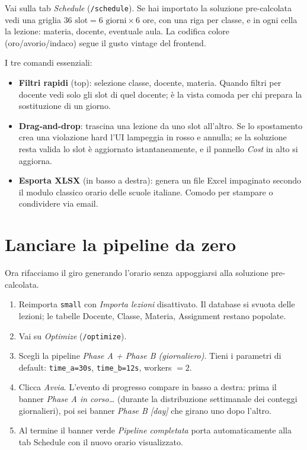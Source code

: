 
Vai sulla tab \emph{Schedule} (\texttt{/schedule}). Se hai
importato la soluzione pre-calcolata vedi una griglia
$36\text{ slot} = 6\text{ giorni} \times 6\text{ ore}$, con
una riga per classe, e in ogni cella la lezione: materia, docente,
eventuale aula. La codifica colore (oro/avorio/indaco) segue il
gusto vintage del frontend.

I tre comandi essenziali:

\begin{itemize}
\item \textbf{Filtri rapidi} (top): selezione classe, docente,
  materia. Quando filtri per docente vedi solo gli slot di quel
  docente; \`e la vista comoda per chi prepara la sostituzione di
  un giorno.
\item \textbf{Drag-and-drop}: trascina una lezione da uno slot
  all'altro. Se lo spostamento crea una violazione hard l'UI
  lampeggia in rosso e annulla; se la soluzione resta valida
  lo slot \`e aggiornato istantaneamente, e il pannello
  \emph{Cost} in alto si aggiorna.
\item \textbf{Esporta XLSX} (in basso a destra): genera un file
  Excel impaginato secondo il modulo classico orario delle scuole
  italiane. Comodo per stampare o condividere via email.
\end{itemize}

\section{Lanciare la pipeline da zero}


Ora rifacciamo il giro generando l'orario senza appoggiarsi alla
soluzione pre-calcolata.

\begin{enumerate}
\item Reimporta \texttt{small} con \emph{Importa lezioni}
  disattivato. Il database si svuota delle lezioni; le tabelle
  Docente, Classe, Materia, Assignment restano popolate.
\item Vai su \emph{Optimize} (\texttt{/optimize}).
\item Scegli la pipeline \emph{Phase A + Phase B (giornaliero)}.
  Tieni i parametri di default: \texttt{time\_a=30s},
  \texttt{time\_b=12s}, workers $= 2$.
\item Clicca \emph{Avvia}. L'evento di progresso compare in basso
  a destra: prima il banner \emph{Phase A in corso\ldots}
  (durante la distribuzione settimanale dei conteggi giornalieri),
  poi sei banner \emph{Phase B [day]} che girano uno dopo l'altro.
\item Al termine il banner verde \emph{Pipeline completata}
  porta automaticamente alla tab Schedule con il nuovo orario
  visualizzato.
\end{enumerate}

